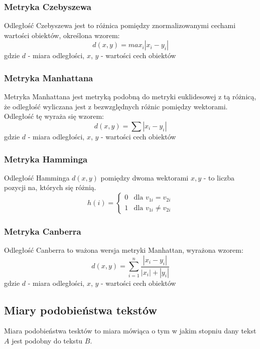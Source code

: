 \documentclass{classrep}
\begin{document}
\subsubsection{Metryka Czebyszewa}
Odległość Czebyszewa jest to różnica pomiędzy znormalizowanymi cechami wartości obiektów, określona wzorem:
\begin{equation}
    d(x,y)=max_{i}|x_{i}-y_{i}|
\end{equation}
gdzie $d$ - miara odległości, $x$, $y$ - wartości cech obiektów

\subsubsection{Metryka Manhattana}
Metryka Manhattana jest metryką podobną do metryki euklidesowej z tą różnicą, że odległość wyliczana jest
z bezwzględnych różnic pomiędzy wektorami. Odległość tę wyraża się wzorem:
\begin{equation}
    d(x,y)=\sum |x_{i}-y_{i}|
\end{equation}
gdzie $d$ - miara odległości, $x$, $y$ - wartości cech obiektów

\subsubsection{Metryka Hamminga}
Odległość Hamminga $d(x,y)$ pomiędzy dwoma wektorami $x, y$ - to liczba pozycji na, których się różnią.
\begin{equation}
    h(i) =\left\{\begin{matrix}
                     0 & \text{dla }v_{1i}=v_{2i}\\
                     1 & \text{dla }v_{1i}\neq v_{2i}
    \end{matrix}\right.
\end{equation}

\subsubsection{Metryka Canberra}
Odległość Canberra to ważona wersja metryki Manhattan, wyrażona wzorem:
\begin{equation}
    d(x,y)=\sum_{i=1}^{n} \frac{|x_{i}-y_{i}|}{|x_{i}|+|y_{i}|}
\end{equation}
gdzie $d$ - miara odległości, $x$, $y$ - wartości cech obiektów

\subsection{Miary podobieństwa tekstów}
Miara podobieństwa tesktów to miara mówiąca o tym w jakim stopniu dany tekst $A$ jest podobny do tekstu $B$.
\end{document}
